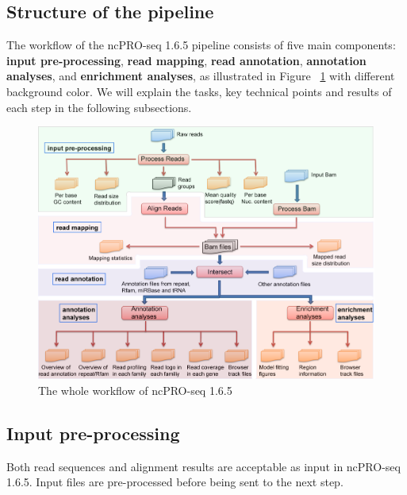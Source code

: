 \documentclass[12pt]{article}
\def \ncpip{ncPRO-seq 1.6.5}
\begin{document}
\subsection{Structure of the pipeline}
The workflow of the \ncpip{} pipeline consists of five main components: \textbf{input pre-processing}, \textbf{read mapping}, \textbf{read annotation}, \textbf{annotation analyses}, and \textbf{enrichment analyses}, as illustrated in Figure ~\ref{fig:pipelinestructure} with different background color. We will explain the tasks, key technical points and results of each step in the following subsections.
\begin{figure}[!h]
\includegraphics[width=160mm]{pipeline.png}
\caption{The whole workflow of \ncpip{}}
\label{fig:pipelinestructure}
\end{figure} 
\subsection{Input pre-processing}
Both read sequences and alignment results are acceptable as input in \ncpip{}. Input files are pre-processed before being sent to the next step.
\end{document}
